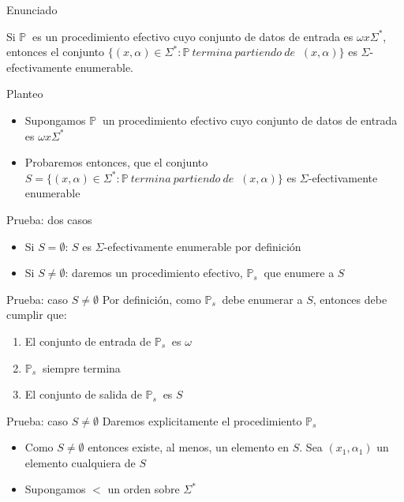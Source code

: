 \documentclass[10pt]{beamer}
\newcommand{\p}{\mathbb{P}}
\begin{document}
\begin{frame}{Enunciado}

    Si $\p\ $ es un procedimiento efectivo cuyo conjunto de datos de entrada es
    $\omega x \Sigma^{*}$, entonces el conjunto $\{(x, \alpha) \in \Sigma^{*}: \p\ termina\ partiendo\ de\ $
    $ (x, \alpha)\}$ es $\Sigma$-efectivamente enumerable.


\end{frame}

\begin{frame}{Planteo}
  \begin{itemize}[<+->]
    \item Supongamos $\p\ $ un procedimiento efectivo cuyo conjunto de datos de
    entrada es $\omega x \Sigma^{*}$
    \item Probaremos entonces, que el conjunto $S = \{(x, \alpha) \in \Sigma^{*}: \p\ termina\ partiendo\ de\ $
    $ (x, \alpha)\}$ es $\Sigma$-efectivamente enumerable
  \end{itemize}

\end{frame}



\begin{frame}{Prueba: dos casos}
  \begin{itemize}[<+->]
    \item Si $S = \emptyset$: $S$ es $\Sigma$-efectivamente enumerable por definición
    \item Si $S \neq \emptyset$: daremos un procedimiento efectivo, $\p_{s}\ $
    que enumere a $S$
  \end{itemize}

\end{frame}


\begin{frame}{Prueba: caso $S \neq \emptyset$}
  Por definición, como $\p_{s}\ $ debe enumerar a $S$, entonces debe cumplir que:

  \begin{enumerate}[<+->]
    \item El conjunto de entrada de $\p_{s}\ $ es $\omega$
    \item $\p_{s}\ $ siempre termina
    \item El conjunto de salida de $\p_{s}\ $ es $S$
  \end{enumerate}

\end{frame}



\begin{frame}{Prueba: caso $S \neq \emptyset$}
  Daremos explicitamente el procedimiento $\p_{s}\ $
  \begin{itemize}[<+->]
    \item Como $S \neq \emptyset$ entonces existe, al menos, un elemento en $S$.
    Sea $(x_{1}, \alpha_{1})$ un elemento cualquiera de $S$
    \item Supongamos $<$ un orden sobre $\Sigma^{*}$
  \end{itemize}

\end{frame}
\end{document}
